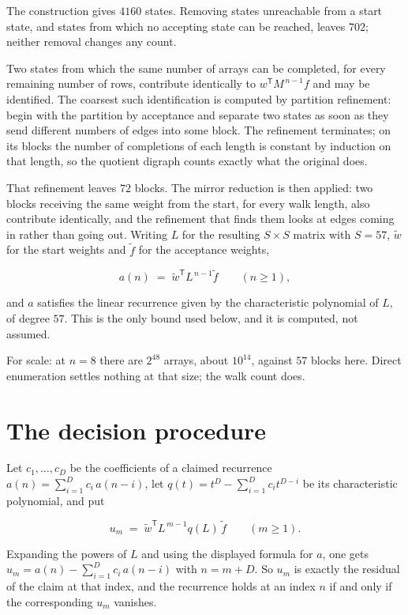 \documentclass[11pt]{article}
\theoremstyle{definition}
\begin{document}
The construction gives $4160$ states. Removing states unreachable from a start state, and states from which no accepting state can be reached, leaves $702$; neither removal changes any count.

Two states from which the same number of arrays can be completed, for every remaining number of rows, contribute identically to $w^{\mathsf T}M^{\,n-1}f$ and may be identified. The coarsest such identification is computed by partition refinement: begin with the partition by acceptance and separate two states as soon as they send different numbers of edges into some block. The refinement terminates; on its blocks the number of completions of each length is constant by induction on that length, so the quotient digraph counts exactly what the original does.

That refinement leaves $72$ blocks. The mirror reduction is then applied: two blocks receiving the same weight from the start, for every walk length, also contribute identically, and the refinement that finds them looks at edges coming in rather than going out. Writing $L$ for the resulting $S \times S$ matrix with $S = 57$, $\tilde w$ for the start weights and $\tilde f$ for the acceptance weights,

\[a(n) \;=\; \tilde w^{\mathsf T} L^{\,n-1} \tilde f \qquad (n \ge 1),\]

and $a$ satisfies the linear recurrence given by the characteristic polynomial of $L$, of degree $57$. This is the only bound used below, and it is computed, not assumed.

For scale: at $n = 8$ there are $2^{48}$ arrays, about $10^{14}$, against $57$ blocks here. Direct enumeration settles nothing at that size; the walk count does.

\section{The decision procedure}

Let $c_1,\dots,c_D$ be the coefficients of a claimed recurrence $a(n) = \sum_{i=1}^{D} c_i\,a(n-i)$, let $q(t) = t^{D} - \sum_{i=1}^{D} c_i t^{D-i}$ be its characteristic polynomial, and put

\[u_m \;=\; \tilde w^{\mathsf T} L^{\,m-1} q(L)\,\tilde f \qquad (m \ge 1).\]

Expanding the powers of $L$ and using the displayed formula for $a$, one gets $u_m = a(n) - \sum_{i=1}^{D} c_i\,a(n-i)$ with $n = m + D$. So $u_m$ is exactly the residual of the claim at that index, and the recurrence holds at an index $n$ if and only if the corresponding $u_m$ vanishes.
\end{document}
